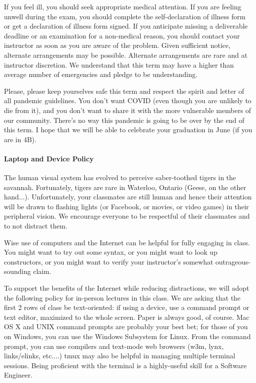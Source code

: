 
If you feel ill, you should seek appropriate medical attention. If you are feeling unwell during the exam, you should complete the self-declaration of illness form or get a declaration of illness form signed. If you anticipate missing a deliverable deadline or an examination for a non-medical reason, you should contact your instructor as soon as you are aware of the problem. Given sufficient notice, alternate arrangements may be possible. Alternate arrangements are rare and at instructor discretion. We understand that this term may have a higher than average number of emergencies and pledge to be understanding.

Please, please keep yourselves safe this term and respect the spirit and letter of all pandemic guidelines. You don't want COVID (even though you are unlikely to die from it), and you don't want to share it with the more vulnerable members of our community. There's no way this pandemic is going to be over by the end of this term. I hope that we will be able to celebrate your graduation in June (if you are in 4B).

\paragraph{Laptop and Device Policy}
The human visual system has evolved to perceive saber-toothed tigers
in the savannah. Fortunately, tigers are rare in Waterloo, Ontario
(Geese, on the other hand...).
Unfortunately, your classmates are still human and hence their
attention will be drawn to flashing lights (or Facebook, or movies, or
video games) in their peripheral vision. We encourage
everyone to be respectful of their classmates and to not distract them.

Wise use of computers and the Internet can be helpful for fully
engaging in class. You might want to try out some syntax, or you might
want to look up constructors, or you might want to verify your
instructor's somewhat outrageous-sounding claim.

To support the benefits of the Internet while reducing distractions,
we will adopt the following policy for in-person lectures in this class. We are asking that the
first 2 rows of class be text-oriented: if using a device, use a
command prompt or text editor, maximized to the whole screen. Paper is
always good, of course. Mac OS X and UNIX command prompts are probably
your best bet; for those of you on Windows, you can use the Windows
Subsystem for Linux. From the command prompt, you can use compilers
and text-mode web browsers (w3m, lynx, links/elinks, etc....) tmux may
also be helpful in managing multiple terminal sessions. Being
proficient with the terminal is a highly-useful skill for a Software
Engineer.

